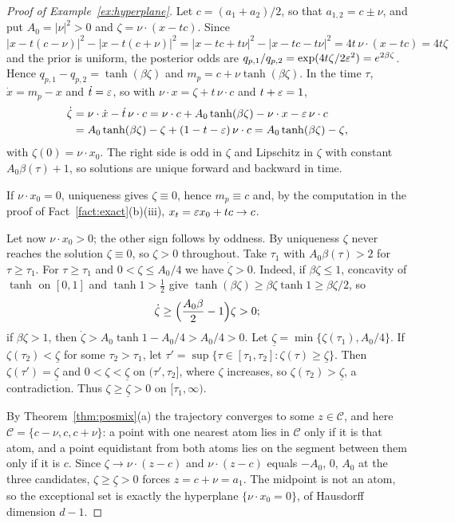 \documentclass{article} %
\theoremstyle{plain}
\theoremstyle{definition}
\theoremstyle{remark}
\begin{document}
\label{apx:pf-hyperplane}
\exhyperplane*
\begin{proof}[Proof of Example~\ref{ex:hyperplane}]
Let $c=(a_1+a_2)/2$, so that $a_{1,2}=c\pm\nu$, and put $A_0=|\nu|^2>0$ and
$\zeta=\nu\cdot(x-tc)$. Since
\[
|x-t(c-\nu)|^2-|x-t(c+\nu)|^2=|x-tc+t\nu|^2-|x-tc-t\nu|^2=4t\,\nu\cdot(x-tc)=4t\zeta
\]
and the prior is uniform, the posterior odds are
$q_{p,1}/q_{p,2}=\exp(4t\zeta/2\varepsilon^2)=e^{2\beta\zeta}$. Hence $q_{p,1}-q_{p,2}=\tanh(\beta\zeta)$
and $m_p=c+\nu\tanh(\beta\zeta)$. In the time $\tau$, $\dot x=m_p-x$ and $\dot t=\varepsilon$, so with
$\nu\cdot x=\zeta+t\,\nu\cdot c$ and $t+\varepsilon=1$,
\begin{align*}
\dot\zeta&=\nu\cdot\dot x-\dot t\,\nu\cdot c
=\nu\cdot c+A_0\tanh(\beta\zeta)-\nu\cdot x-\varepsilon\,\nu\cdot c\\
&=A_0\tanh(\beta\zeta)-\zeta+(1-t-\varepsilon)\,\nu\cdot c
=A_0\tanh(\beta\zeta)-\zeta,
\end{align*}
with $\zeta(0)=\nu\cdot x_0$. The right side is odd in $\zeta$ and Lipschitz in $\zeta$ with constant
$A_0\beta(\tau)+1$, so solutions are unique forward and backward in time.

If $\nu\cdot x_0=0$, uniqueness gives $\zeta\equiv0$, hence $m_p\equiv c$ and, by the computation in
the proof of Fact~\ref{fact:exact}(b)(iii), $x_t=\varepsilon x_0+tc\to c$.

Let now $\nu\cdot x_0>0$; the other sign follows by oddness. By uniqueness $\zeta$ never reaches the
solution $\zeta\equiv0$, so $\zeta>0$ throughout. Take $\tau_1$ with $A_0\beta(\tau)>2$ for
$\tau\ge\tau_1$. For $\tau\ge\tau_1$ and $0<\zeta\le A_0/4$ we have $\dot\zeta>0$. Indeed, if
$\beta\zeta\le1$, concavity of $\tanh$ on $[0,1]$ and $\tanh1>\tfrac12$ give
$\tanh(\beta\zeta)\ge\beta\zeta\tanh1\ge\beta\zeta/2$, so
\[
\dot\zeta\ge\Bigl(\frac{A_0\beta}2-1\Bigr)\zeta>0 ;
\]
if $\beta\zeta>1$, then $\dot\zeta>A_0\tanh1-A_0/4>A_0/4>0$. Let
$\underline\zeta=\min\{\zeta(\tau_1),A_0/4\}$. If $\zeta(\tau_2)<\underline\zeta$ for some
$\tau_2>\tau_1$, let $\tau'=\sup\{\tau\in[\tau_1,\tau_2]:\zeta(\tau)\ge\underline\zeta\}$. Then
$\zeta(\tau')=\underline\zeta$ and $0<\zeta<\underline\zeta$ on $(\tau',\tau_2]$, where $\zeta$
increases, so $\zeta(\tau_2)>\underline\zeta$, a contradiction. Thus $\zeta\ge\underline\zeta>0$ on
$[\tau_1,\infty)$.

By Theorem~\ref{thm:posmix}(a) the trajectory converges to some $z\in\mathcal C$, and here
$\mathcal C=\{c-\nu,c,c+\nu\}$: a point with one nearest atom lies in $\mathcal C$ only if it is that
atom, and a point equidistant from both atoms lies on the segment between them only if it is $c$.
Since $\zeta\to\nu\cdot(z-c)$ and $\nu\cdot(z-c)$ equals $-A_0$, $0$, $A_0$ at the three candidates,
$\zeta\ge\underline\zeta>0$ forces $z=c+\nu=a_1$. The midpoint is not an atom, so the exceptional
set is exactly the hyperplane $\{\nu\cdot x_0=0\}$, of Hausdorff dimension $d-1$.
\end{proof}
\end{document}
